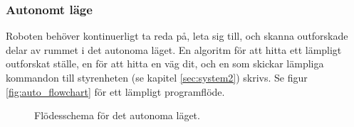 \documentclass[a4paper,11pt]{article}
\begin{document}
\clearpage

\subsubsection{Autonomt läge}
Roboten behöver kontinuerligt ta reda på, leta sig till, och skanna outforskade delar av rummet i det autonoma läget. En algoritm för att hitta ett lämpligt outforskat ställe, en för att hitta en väg dit, och en som skickar lämpliga kommandon till styrenheten (se kapitel \ref{sec:system2}) skrivs. Se figur \ref{fig:auto_flowchart} för ett lämpligt programflöde.

\begin{figure}[h!]
	\caption{Flödesschema för det autonoma läget.  }
\end{figure}
\end{document}
